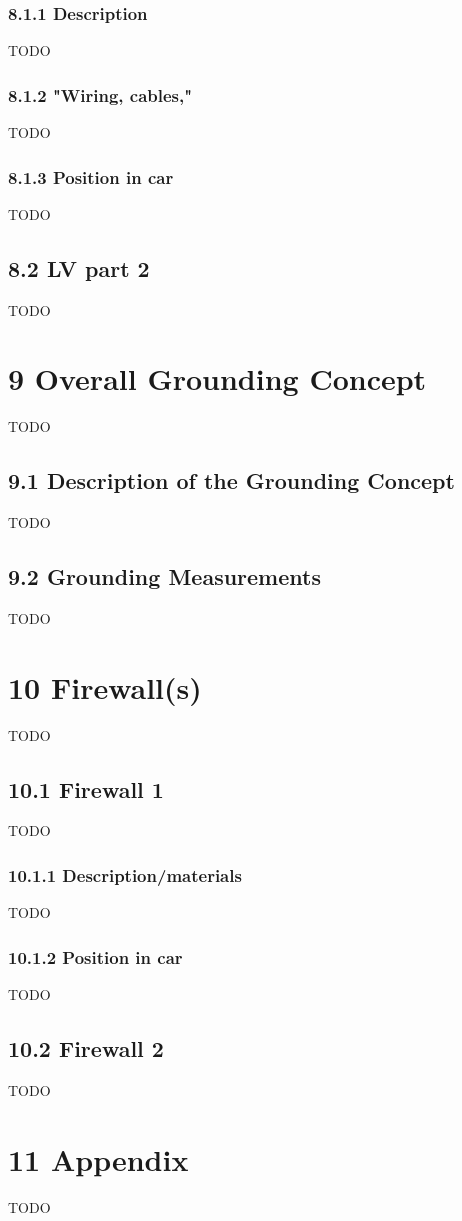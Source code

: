 \documentclass{article}
\begin{document}
\subsubsection*{8.1.1 Description}
TODO

\subsubsection*{8.1.2 "Wiring, cables,"}
TODO

\subsubsection*{8.1.3 Position in car}
TODO

\subsection*{8.2 LV part 2}
TODO

\section*{9 Overall Grounding Concept}
TODO

\subsection*{9.1 Description of the Grounding Concept}
TODO

\subsection*{9.2 Grounding Measurements}
TODO

\section*{10 Firewall(s)}
TODO

\subsection*{10.1 Firewall 1}
TODO

\subsubsection*{10.1.1 Description/materials}
TODO

\subsubsection*{10.1.2 Position in car}
TODO

\subsection*{10.2 Firewall 2}
TODO

\section*{11 Appendix}
TODO
\end{document}
